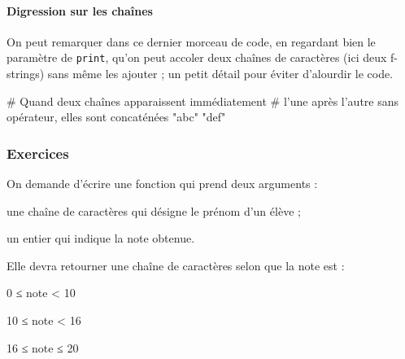 \paragraph*{Digression sur les chaînes}
On peut remarquer dans ce dernier morceau de code, en regardant bien le paramètre de \texttt{print}, qu'on peut accoler deux chaînes de caractères (ici deux f-strings) sans même les ajouter ; un petit détail pour éviter d'alourdir le code.

\begin{idleconsole}
\begin{pyconsole}
# Quand deux chaînes apparaissent immédiatement
# l'une après l'autre sans opérateur, elles sont concaténées
"abc" "def"
\end{pyconsole}
\end{idleconsole}

\subsubsection[Exercices]{Exercices}
\label{subsub:XI.3.3.3}

\begin{exercise}[title=Notes des élèves, level=basic]
On demande d'écrire une fonction qui prend deux arguments :
\begin{jazzitemize}
\item une chaîne de caractères qui désigne le prénom d'un élève ;
\item un entier qui indique la note obtenue.
\end{jazzitemize}
Elle devra retourner une chaîne de caractères selon que la note est :
\begin{multicols}{3}
\begin{jazzitemize}
\item 0 ≤ note < 10
\item 10 ≤ note < 16
\item 16 ≤ note ≤ 20
\end{jazzitemize}
\end{multicols}
\end{exercise}

